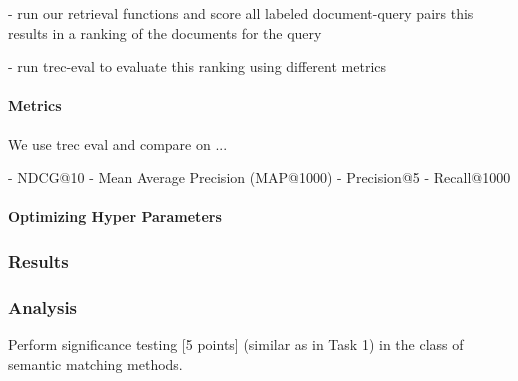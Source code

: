 - run our retrieval functions and score all labeled document-query pairs
this results in a ranking of the documents for the query

- run trec-eval to evaluate this ranking using different metrics


\paragraph{Metrics}
We use trec eval and compare on ...

- NDCG@10
- Mean Average Precision (MAP@1000) 
- Precision@5
- Recall@1000

\paragraph{Optimizing Hyper Parameters}
%


\subsubsection{Results}
%

\subsubsection{Analysis}


Perform significance testing [5 points] (similar as in Task 1) in the class of semantic matching methods.